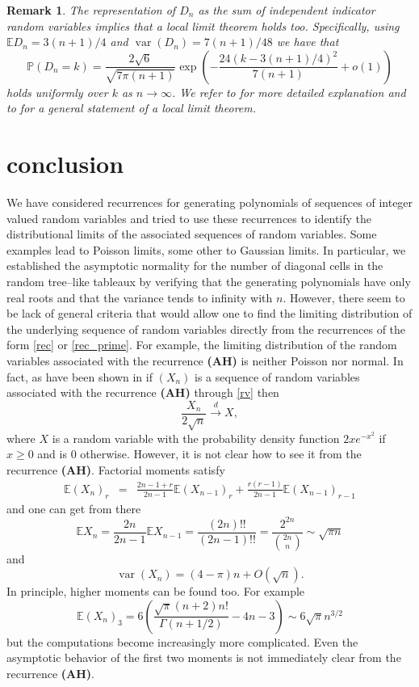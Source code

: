 \documentclass[10pt]{amsart}
\newtheorem{remark}{Remark}
\numberwithin{subcase}{case}
\begin{document}
\begin{remark} The representation of $D_n$ as the sum of independent indicator random variables implies that a  local limit theorem holds too. Specifically,
using ${\mathbb{E}} D_n=3(n+1)/4$ and ${\operatorname{var}}(D_n)=7(n+1)/48$ we have that
\[{\mathbb{P}}(D_n=k)=\frac{2\sqrt6}{\sqrt{7\pi(n+1)}}\exp\left(-\frac{24(k-3(n+1)/4)^2}{7(n+1)}+o(1)\right)\]
holds uniformly over $k$ as $n\to\infty$.
We refer to \cite[Theorem~2.7 and a discussion of its proof in Section~5]{HJ}  for more detailed explanation and to \cite[Theorem~VII.3]{P} for a general statement of a local limit theorem.
\end{remark}

\section{conclusion}

We have considered recurrences for generating polynomials of sequences of integer valued random variables  and tried to use these recurrences to identify  the distributional limits of the associated sequences of random variables. Some examples lead to Poisson limits, some other to Gaussian limits.  In particular, we established the asymptotic normality for the number of diagonal cells in the random tree--like tableaux by verifying that the generating polynomials have only real roots and that the variance tends to infinity with $n$. However, there seem to be lack of general criteria that would allow one to find the limiting distribution of the underlying sequence of random variables directly from the recurrences of the form \eqref{rec} or \eqref{rec_prime}. For example, the limiting distribution of the random variables associated with the recurrence  {\bf(AH)} is neither Poisson nor normal. In fact, as have been shown in \cite[Section~3]{AH} if $(X_n)$ is a sequence of random variables associated with the recurrence {\bf(AH)} through \eqref{rv} then 
\[\frac{X_n}{2\sqrt n}\stackrel d\longrightarrow X,\]
where $X$ is a random variable with the probability density function $2xe^{-x^2}$ if $x\ge0$ and is 0 otherwise. However, it is not clear how to see it 
from the recurrence {\bf(AH)}. Factorial moments
satisfy 
\begin{eqnarray*}{\mathbb{E}}{(X_{n})_r}&=&
\frac{2n-1+r}{2n-1}{\mathbb{E}}{(X_{n-1})_r}+\frac{r(r-1)}{2n-1}{\mathbb{E}}{(X_{n-1})_{r-1}}
\end{eqnarray*}
and one can get from there
\[
{\mathbb{E}}{X_{n}}=\frac{2n}{2n-1}{\mathbb{E}}{X_{n-1}} =
\frac{(2n)!!}{(2n-1)!!}=\frac{2^{2n}}{{2n\choose n}}\sim\sqrt{\pi n} 
\]
and
\[
{\operatorname{var}}(X_{n})= (4-\pi)n+O(\sqrt n).\]
In principle, higher moments can be found too. For example 
\[
{\mathbb{E}}{(X_{n})_3}=6\left(\frac{\sqrt\pi(n+2)n!}{\Gamma(n+1/2)}-4n-3\right)\sim6\sqrt\pi n^{3/2}
\]
but the computations become increasingly more complicated. Even the asymptotic behavior of the first two moments is not immediately clear from the recurrence {\bf(AH)}.
\end{document}
